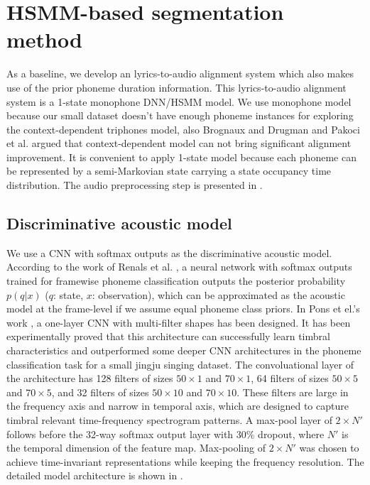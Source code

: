 \section{HSMM-based segmentation method}\label{sec:ch5:hsmm_segmentation}

As a baseline, we develop an lyrics-to-audio alignment system which also makes use of the prior phoneme duration information. This lyrics-to-audio alignment system is a 1-state monophone DNN/HSMM model. We use monophone model because our small dataset doesn't have enough phoneme instances for exploring the context-dependent triphones model, also Brognaux and Drugman \cite{brognaux2016hmm} and Pakoci et al. \cite{pakoci2016phonetic} argued that context-dependent model can not bring significant alignment improvement. It is convenient to apply 1-state model because each phoneme can be represented by a semi-Markovian state carrying a state occupancy time distribution. The audio preprocessing step is presented in .

\subsection{Discriminative acoustic model}

We use a CNN with softmax outputs as the discriminative acoustic model. According to the work of Renals et al. \cite{Renals1994Connectionist}, a neural network with softmax outputs trained for framewise phoneme classification outputs the posterior probability $p(q|x)$ ($q$: state, $x$: observation), which can be approximated as the acoustic model at the frame-level if we assume equal phoneme class priors. In Pons et el.'s work \cite{Pons2017Timbre}, a one-layer CNN with multi-filter shapes has been designed. It has been experimentally proved that this architecture can successfully learn timbral characteristics and outperformed some deeper CNN architectures in the phoneme classification task for a small jingju singing dataset. The convoluational layer of the architecture has 128 filters of sizes $50{\times}1$ and $70{\times}1$, 64 filters of sizes $50{\times}5$ and $70{\times}5$, and 32 filters of sizes $50{\times}10$ and $70{\times}10$. These filters are large in the frequency axis and narrow in temporal axis, which are designed to capture timbral relevant time-frequency spectrogram patterns. A max-pool layer of $2{\times}N'$ follows before the 32-way softmax output layer with 30\% dropout, where $N'$ is the temporal dimension of the feature map. Max-pooling of $2{\times}N'$ was chosen to achieve time-invariant representations
while keeping the frequency resolution. The detailed model architecture is shown in .

